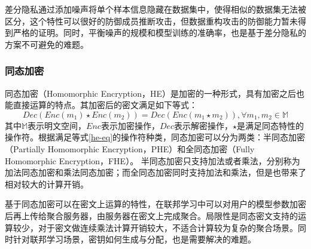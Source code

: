 差分隐私通过添加噪声将单个样本信息隐藏在数据集中，使得相似的数据集无法被区分，这个特性可以很好的防御成员推断攻击，但数据重构攻击的防御能力暂未得到严格的证明。同时，平衡噪声的规模和模型训练的准确率，也是基于差分隐私的方案不可避免的难题。
%	

\subsubsection{同态加密}
同态加密（Homomorphic Encryption，HE）\cite{rivest1978data}是加密的一种形式，具有加密之后也能直接运算的特点。其加密后的密文满足如下等式：
\begin{equation}\label{he-eq}
	Dec(Enc(m_1)\star Enc(m_2)) = Dec(Enc(m_1\star m_2)), \forall m_1,m_2 \in \mathbb{M}
\end{equation}
其中$ \mathbb{M} $表示明文空间，$Enc$表示加密操作，$Dec$表示解密操作，$\star$是满足同态特性的操作符。根据满足等式\ref{he-eq}的操作符种类，同态加密可以分为两类：半同态加密（Partially Homomorphic Encryption，PHE）\cite{paillier1999public}和全同态加密（Fully Homomorphic Encryption，FHE）\cite{van2010fully}。
半同态加密只支持加法或者乘法，分别称为加法同态加密\cite{kawachi2007multi}和乘法同态加密\cite{elgamal1985public}；而全同态加密同时支持加法和乘法，但是也带来了相对较大的计算开销。

基于同态加密可以在密文上运算的特性，在联邦学习中可以对用户的模型参数加密后再上传给聚合服务器，由服务器在密文上完成聚合。局限性是同态密文支持的运算较少，对于密文做连续乘法计算开销较大，不适合计算较为复杂的聚合场景。同时针对联邦学习场景，密钥如何生成与分配，也是需要解决的难题。

